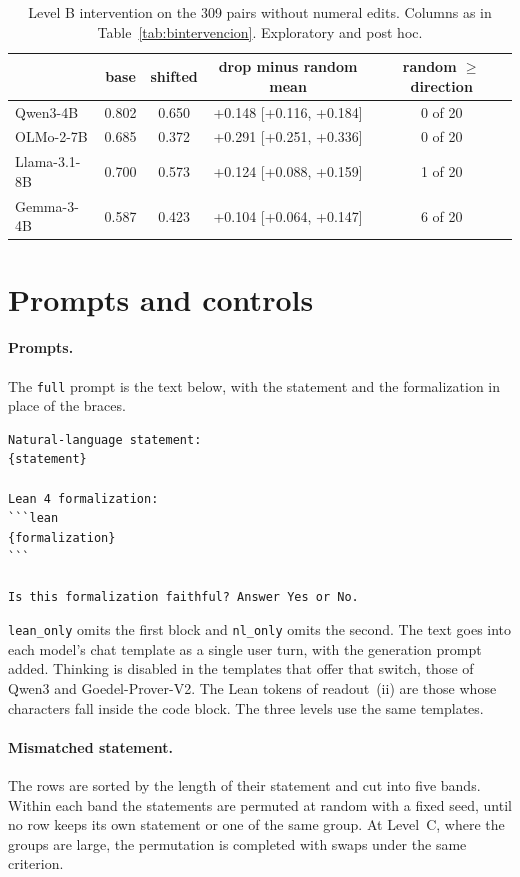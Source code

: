 \documentclass[10pt]{article}
\newcommand{\vr}[1]{\texttt{#1}}
\begin{document}
\begin{table}[h]
\centering
\caption{Level B intervention on the 309 pairs without numeral edits. Columns as in Table~\ref{tab:bintervencion}. Exploratory and post hoc.}
\label{tab:bsinc2}
\vspace{2pt}
{\footnotesize
\begin{tabular}{@{}lcccc@{}}
\toprule
 & base & shifted & drop minus random mean & random $\geq$ direction\\
\midrule
Qwen3-4B     & 0.802 & 0.650 & +0.148 [+0.116, +0.184] & 0 of 20\\
OLMo-2-7B    & 0.685 & 0.372 & +0.291 [+0.251, +0.336] & 0 of 20\\
Llama-3.1-8B & 0.700 & 0.573 & +0.124 [+0.088, +0.159] & 1 of 20\\
Gemma-3-4B   & 0.587 & 0.423 & +0.104 [+0.064, +0.147] & 6 of 20\\
\bottomrule
\end{tabular}}
\end{table}

\section{Prompts and controls}\label{app:definiciones}

\paragraph{Prompts.} The \vr{full} prompt is the text below, with the statement and the formalization in place of the
braces.
\begin{verbatim}
Natural-language statement:
{statement}

Lean 4 formalization:
```lean
{formalization}
```

Is this formalization faithful? Answer Yes or No.
\end{verbatim}
\vr{lean\_only} omits the first block and \vr{nl\_only} omits the second. The text goes into each model's chat
template as a single user turn, with the generation prompt added. Thinking is disabled in the templates that offer
that switch, those of Qwen3 and Goedel-Prover-V2. The Lean tokens of readout~(ii) are those whose characters fall
inside the code block. The three levels use the same templates.

\paragraph{Mismatched statement.} The rows are sorted by the length of their statement and cut into five bands. Within
each band the statements are permuted at random with a fixed seed, until no row keeps its own statement or one of the
same group. At Level~C, where the groups are large, the permutation is completed with swaps under the same criterion.
\end{document}

